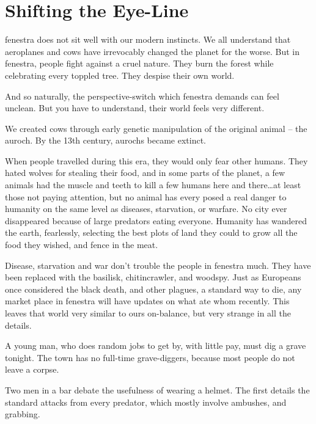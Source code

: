 \section*{Shifting the Eye-Line}

\begin{multicols}{2}

\noindent
\Gls{fenestra} does not sit well with our modern instincts.
We all understand that aeroplanes and cows have irrevocably changed the planet for the worse.
But in \gls{fenestra}, people fight against a cruel nature.
They burn the forest while celebrating every toppled tree.
They despise their own world.

And so naturally, the perspective-switch which \gls{fenestra} demands can feel unclean.
But you have to understand, their world feels very different.

We created cows through early genetic manipulation of the original animal -- the auroch.
By the 13th century, aurochs became extinct.

When people travelled during this era, they would only fear other humans.
They hated wolves for stealing their food, and in some parts of the planet, a few animals had the muscle and teeth to kill a few humans here and there\ldots at least those not paying attention, but no animal has every posed a real danger to humanity on the same level as diseases, starvation, or warfare.
No city ever disappeared because of large predators eating everyone.
Humanity has wandered the earth, fearlessly, selecting the best plots of land they could to grow all the food they wished, and fence in the meat.

Disease, starvation and war don't trouble the people in \gls{fenestra} much.
They have been replaced with the basilisk, chitincrawler, and woodspy.
Just as Europeans once considered the black death, and other plagues, a standard way to die, any market place in \gls{fenestra} will have updates on what ate whom recently.
This leaves that world very similar to ours on-balance, but very strange in all the details.

\begin{exampletext}
  A young man, who does random jobs to get by, with little pay, must dig a grave tonight.
  The town has no full-time grave-diggers, because most people do not leave a corpse.
\end{exampletext}

\begin{exampletext}
  Two men in a bar debate the usefulness of wearing a helmet.
  The first details the standard attacks from every predator, which mostly involve ambushes, and grabbing.


\end{exampletext}
\end{multicols}

